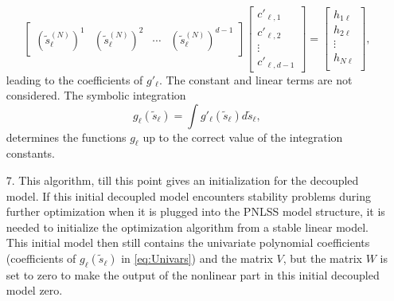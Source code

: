 \documentclass[review]{elsarticle}
\begin{document}
\begin{itemize}
\begin{equation}
\begin{bmatrix}
(\tilde{s}_{\ell}^{(N)})^1 & (\tilde{s}_{\ell}^{(N)})^2 & \cdots & (\tilde{s}_{\ell}^{(N)})^{d-1}
\end{bmatrix}
\begin{bmatrix}
{c}'_{\ell,1} \\
{c}'_{\ell,2} \\
\vdots \\
{c}'_{\ell,d-1}
\end{bmatrix}= 
\begin{bmatrix}
{h}_{1\ell} \\
{h}_{2\ell} \\
\vdots \\
{h}_{N\ell} \\
\end{bmatrix},\label{Eq:DECREGR}
\end{equation}
leading to the coefficients of $g'_\ell$. The constant and linear terms are not considered. 
The symbolic integration
\begin{equation}
g_\ell(\tilde{s}_\ell) = \int {g}'_\ell(\tilde{s}_\ell)d\tilde{s}_\ell,\label{eq:Univars}
\end{equation}
determines the functions $g_\ell$ up to the correct value of the integration constants.
\item[7.] This algorithm, till this point gives an initialization for the decoupled model. If this initial decoupled model encounters stability problems during further optimization when it is plugged into the PNLSS model structure, it is needed to initialize the optimization algorithm from a stable linear model. This initial model then still contains the univariate polynomial coefficients (coefficients of $g_{\ell}(\tilde{s}_{\ell})$ in \eqref{eq:Univars}) and the matrix $V$, but the matrix $W$ is set to zero to make the output of the nonlinear part in this initial decoupled model zero.

\end{itemize}
\end{document}
